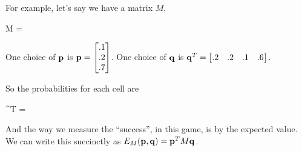 For example, let's say we have a matrix $M$,
\begin{frml}
	M = 
\end{frml}

One choice of $\mathbf{p}$ is $\mathbf{p} = \begin{bmatrix} .1 \\ .2 \\ .7 \end{bmatrix}$. One choice of $\mathbf{q}$ is
$\mathbf{q}^T = \begin{bmatrix} .2 & .2 & .1 & .6 \end{bmatrix}$.

So the probabilities for each cell are 
\begin{frml}
	\vp\vq^T =  
\end{frml}

And the way we measure the ``success'', in this game, is by the expected value.
We can write this succinctly as $E_M(\mathbf{p}, \mathbf{q}) = \mathbf{p}^T M \mathbf{q}$.
